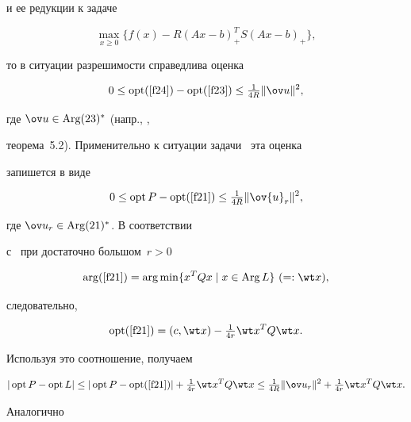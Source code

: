 и ее редукции к задаче


\begin{equation}


\label{f24}


\max_{x\geq 0} \{ f(x) -R (Ax-b)_+^T S (Ax-b)_+ \},


\end{equation}


то в ситуации разрешимости  справедлива оценка


$$


0\le \opt\rf{f24} -\opt\rf{f23} \le


\tfrac{1}{4R} \| \ov u\|^2,


$$


где $\ov u\in\Arg (23)^*$ (напр., \cite{2},


теорема~5.2). Применительно к ситуации задачи~ эта оценка


запишется в виде


$$


\label{f25}


0\le \opt P -\opt\rf{f21} \le \tfrac{1}{4R} 


\| \ov {u}_r \|^2,


$$


где $\ov u_r\in\Arg (21)^*$. В соответствии


с~ при достаточно большом~$r>0$


$$


\arg\rf{f21} =\arg\min \{ x^T Q x \mid x\in


\Arg L\}\ (=: \wt x),


$$


следовательно,


$$


\opt\rf{f21} = (c, \wt x) -\tfrac{ 1}{ 4r} 


\wt x^T Q \wt x.


$$


Используя это соотношение, получаем


\begin{equation}


\label{f26}


|\opt P -\opt L| \le |\opt P -\opt\rf{f21}|


+\tfrac{1}{4r} \wt x^T Q \wt x \le \tfrac{1}{4R} 


\| \ov u_r \|^2 + \tfrac{1}{4r} \wt x^T Q \wt x.


\end{equation}


Аналогично


